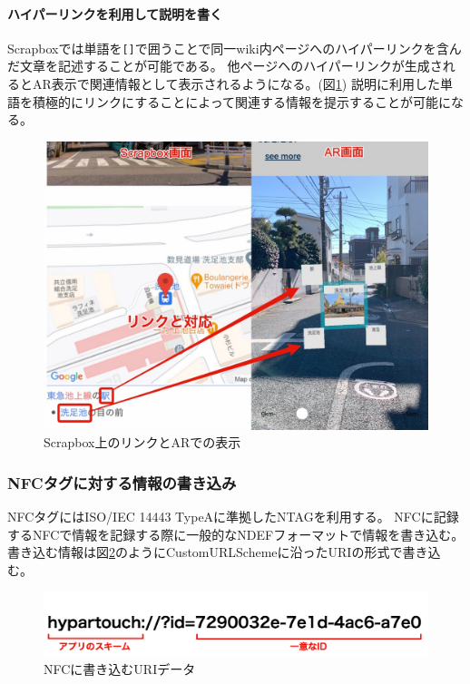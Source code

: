 \paragraph*{ハイパーリンクを利用して説明を書く}
Scrapboxでは単語を\texttt{[]}で囲うことで同一wiki内ページへのハイパーリンクを含んだ文章を記述することが可能である。
他ページヘのハイパーリンクが生成されるとAR表示で関連情報として表示されるようになる。(図\ref{fig:scrapbox_link_and_ar})
説明に利用した単語を積極的にリンクにすることによって関連する情報を提示することが可能になる。

\begin{figure}[htbp]
  \centering
  \includegraphics[width=120mm]{images/scrapbox_link_and_ar.jpg}
  \caption{Scrapbox上のリンクとARでの表示} \label{fig:scrapbox_link_and_ar}
\end{figure}

\subsubsection{NFCタグに対する情報の書き込み}
NFCタグにはISO/IEC 14443 TypeAに準拠したNTAGを利用する。
NFCに記録するNFCで情報を記録する際に一般的なNDEFフォーマットで情報を書き込む。
書き込む情報は図\ref{fig:nfc_uri}のようにCustomURLSchemeに沿ったURIの形式で書き込む。

\begin{figure}[htbp]
  \centering
  \includegraphics[width=120mm]{images/nfc_uri.png}
  \caption{NFCに書き込むURIデータ} \label{fig:nfc_uri}
\end{figure}

